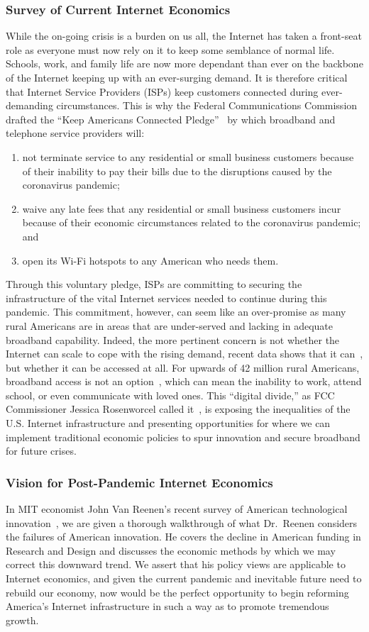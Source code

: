 \documentclass[journal]{IEEEtran}
\begin{document}
\subsubsection{Survey of Current Internet Economics}
While the on-going crisis is a burden on us all, the Internet has taken a front-seat role as everyone must now rely on it to keep some semblance of normal life. Schools, work, and family life are now more dependant than ever on the backbone of the Internet keeping up with an ever-surging demand. It is therefore critical that Internet Service Providers (ISPs) keep customers connected during ever-demanding circumstances. This is why the Federal Communications Commission drafted the \enquote{Keep Americans Connected Pledge}~\cite{FCCpledge} by which broadband and telephone service providers will:
\begin{enumerate}
    \item not terminate service to any residential or small business customers because of their inability to pay their bills due to the disruptions caused by the coronavirus pandemic;
    \item waive any late fees that any residential or small business customers incur because of their economic circumstances related to the coronavirus pandemic; and
    \item open its Wi-Fi hotspots to any American who needs them.
\end{enumerate}
Through this voluntary pledge, ISPs are committing to securing the infrastructure of the vital Internet services needed to continue during this pandemic.
This commitment, however, can seem like an over-promise as many rural Americans are in areas that are under-served and lacking in adequate broadband capability. Indeed, the more pertinent concern is not whether the Internet can scale to cope with the rising demand, recent data shows that it can~\cite{IEEE_InternetCoping}, but whether it can be accessed at all. For upwards of 42 million rural Americans, broadband access is not an option~\cite{IEEE_broadbandRights}, which can mean the inability to work, attend school, or even communicate with loved ones. This \enquote{digital divide,} as FCC Commissioner Jessica Rosenworcel called it~\cite{FCC_Dissent}, is exposing the inequalities of the U.S. Internet infrastructure and presenting opportunities for where we can implement traditional economic policies to spur innovation and secure broadband for future crises.
\subsubsection{Vision for Post-Pandemic Internet Economics}
In MIT economist John Van Reenen's recent survey of American technological innovation~\cite{MIT_Economist}, we are given a thorough walkthrough of what Dr.\ Reenen considers the failures of American innovation. He covers the decline in American funding in Research and Design and discusses the economic methods by which we may correct this downward trend. We assert that his policy views are applicable to Internet economics, and given the current pandemic and inevitable future need to rebuild our economy, now would be the perfect opportunity to begin reforming America's Internet infrastructure in such a way as to promote tremendous growth.
\end{document}
